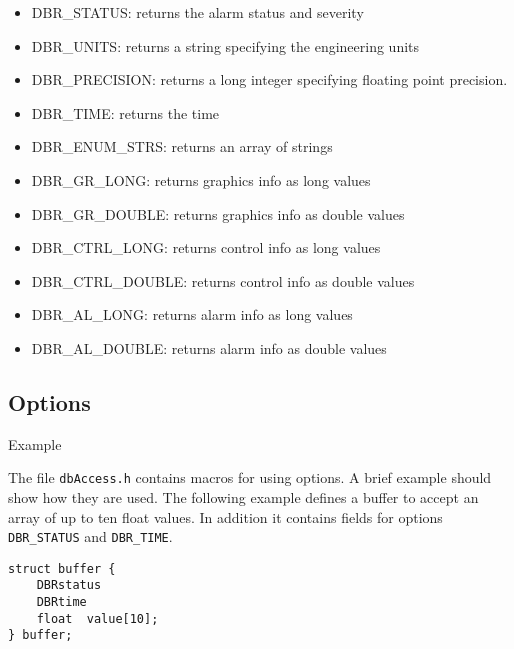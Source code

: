 \begin{itemize}
\item {}DBR\_STATUS:  returns the alarm status and severity

\item {}DBR\_UNITS:  returns a string specifying the engineering units

\item {}DBR\_PRECISION:  returns a long integer specifying floating point precision.

\item {}DBR\_TIME:  returns the time

\item {}DBR\_ENUM\_STRS:  returns an array of strings

\item {}DBR\_GR\_LONG:  returns graphics info as long values

\item {}DBR\_GR\_DOUBLE:  returns graphics info as double values

\item {}DBR\_CTRL\_LONG:  returns control info as long values

\item {}DBR\_CTRL\_DOUBLE:  returns control info as double values

\item {}DBR\_AL\_LONG:  returns alarm info as long values

\item {}DBR\_AL\_DOUBLE:  returns alarm info as double values

\end{itemize}

\subsection{Options}

Example

The file \verb|dbAccess.h| contains macros for using options. A brief example should show how they are used. The following 
example defines a buffer to accept an array of up to ten float values. In addition it contains fields for options 
\verb|DBR_STATUS| and \verb|DBR_TIME|. 

\begin{verbatim}
struct buffer {
    DBRstatus
    DBRtime
    float  value[10];
} buffer;
\end{verbatim}

